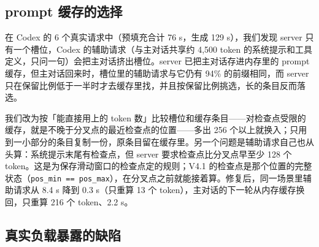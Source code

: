 \documentclass[11pt,a4paper]{article}
\newcommand{\code}[1]{\texttt{#1}}
\begin{document}
\subsection{prompt 缓存的选择}
\label{sec:promptcache}

在 Codex 的 6 个真实请求中（预填充合计 76 s，生成 129 s），我们发现 server 只有一个槽位，Codex 的辅助请求（与主对话共享约 4,500 token 的系统提示和工具定义，只问一句）会把主对话挤出槽位。server 已把主对话存进内存里的 prompt 缓存，但主对话回来时，槽位里的辅助请求与它仍有 94\% 的前缀相同，而 server 只在保留比例低于一半时才去缓存里找，并且按保留比例挑选，长的条目反而落选。

我们改为按「能直接用上的 token 数」比较槽位和缓存条目——对检查点受限的缓存，就是不晚于分叉点的最近检查点的位置——多出 256 个以上就换入；只用到一小部分的条目复制一份，原条目留在缓存里。另一个问题是辅助请求自己也从头算：系统提示末尾有检查点，但 server 要求检查点比分叉点早至少 128 个 token。这是为保存滑动窗口的检查点定的规则；V4.1 的检查点是那个位置的完整状态（\code{pos\_min == pos\_max}），在分叉点之前就能接着算。修复后，同一场景里辅助请求从 8.4 s 降到 0.3 s（只重算 13 个 token），主对话的下一轮从内存缓存换回，只重算 216 个 token、2.2 s。

\subsection{真实负载暴露的缺陷}
\label{sec:incidents}
\end{document}
